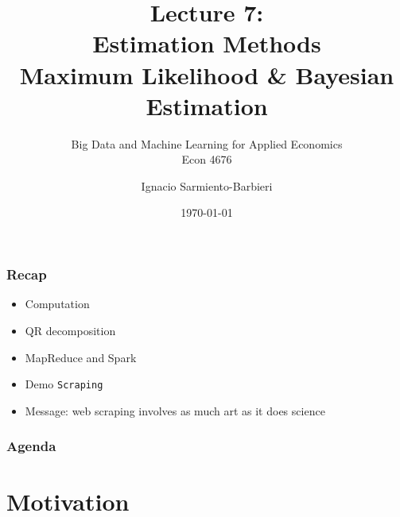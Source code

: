\documentclass[
  shownotes,
  xcolor={svgnames},
  hyperref={colorlinks,citecolor=DarkBlue,linkcolor=DarkRed,urlcolor=DarkBlue}
  ]{beamer}
\begin{document}
\title[Lecture 7]{Lecture 7: \\ Estimation Methods \\ Maximum Likelihood \& Bayesian Estimation}
\subtitle{Big Data and Machine Learning for Applied Economics \\ Econ 4676}
\date{\today}

\author[Sarmiento-Barbieri]{Ignacio Sarmiento-Barbieri}


\begin{frame}[noframenumbering]
\maketitle
\end{frame}



\begin{frame}
\frametitle{Recap}

\begin{itemize} 
      
    \item Computation
    \bigskip
    \item QR decomposition
    \bigskip
    \item MapReduce and Spark
    \bigskip
    \item Demo \texttt{Scraping}
    \bigskip
    \item Message: web scraping involves as much art as it does science
  \bigskip  
\end{itemize}
\end{frame}


\begin{frame}
\frametitle{Agenda}

\tableofcontents


\end{frame}



\section{Motivation}
\end{document}

